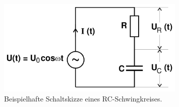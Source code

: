 \begin{figure}[h]
    \centering
    \includegraphics[width=0.8\textwidth]{img/kirchhoff.png}
    \caption{Beispielhafte Schaltskizze eines RC-Schwingkreises.}
    \label{fig:Kirchhoff}
\end{figure}

